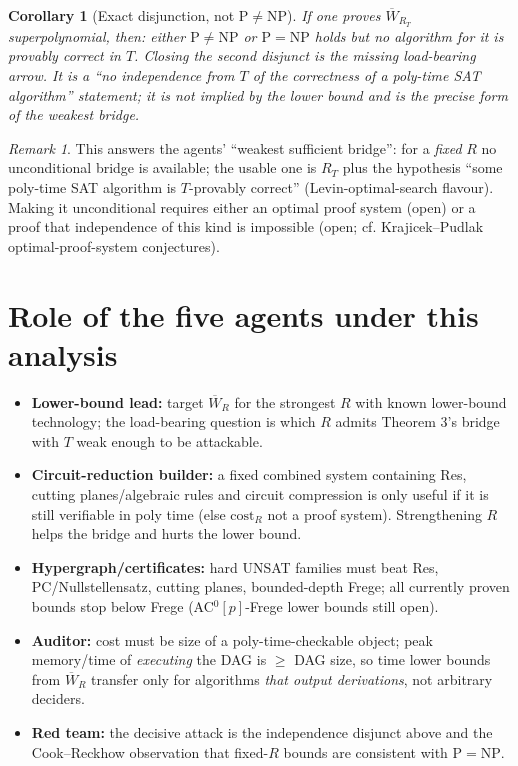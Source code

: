 \documentclass[11pt]{article}
\newtheorem{corollary}[theorem]{Corollary}
\theoremstyle{remark}\newtheorem*{remark}{Remark}
\begin{document}
\begin{corollary}[Exact disjunction, not P$\ne$NP]
If one proves $\overline W_{R_T}$ superpolynomial, then: \emph{either} $\mathrm{P}\ne\mathrm{NP}$ \emph{or} $\mathrm{P}=\mathrm{NP}$ holds but no algorithm for it is
provably correct in $T$. Closing the second disjunct is the missing load-bearing arrow. It is a ``no independence from $T$ of the correctness of a poly-time SAT algorithm''
statement; it is not implied by the lower bound and is the precise form of the weakest bridge.
\end{corollary}
\begin{remark} This answers the agents' ``weakest sufficient bridge'': for a \emph{fixed} $R$ no unconditional bridge is available; the usable one is
$R_T$ plus the hypothesis ``some poly-time SAT algorithm is $T$-provably correct'' (Levin-optimal-search flavour). Making it unconditional requires either
an optimal proof system (open) or a proof that independence of this kind is impossible (open; cf. Krajicek--Pudlak optimal-proof-system conjectures).
\end{remark}

\section{Role of the five agents under this analysis}
\begin{itemize}
\item \textbf{Lower-bound lead:} target $\overline W_{R}$ for the strongest $R$ with known lower-bound technology; the load-bearing question is which $R$ admits Theorem 3's bridge with $T$ weak enough to be attackable.
\item \textbf{Circuit-reduction builder:} a fixed combined system containing Res, cutting planes/algebraic rules and circuit compression is only useful if it is still verifiable in poly time (else $\mathrm{cost}_R$ not a proof system). Strengthening $R$ helps the bridge and hurts the lower bound.
\item \textbf{Hypergraph/certificates:} hard UNSAT families must beat Res, PC/Nullstellensatz, cutting planes, bounded-depth Frege; all currently proven bounds stop below Frege (AC$^0[p]$-Frege lower bounds still open).
\item \textbf{Auditor:} cost must be size of a poly-time-checkable object; peak memory/time of \emph{executing} the DAG is $\ge$ DAG size, so time lower bounds from $\overline W_R$ transfer only for algorithms \emph{that output derivations}, not arbitrary deciders.
\item \textbf{Red team:} the decisive attack is the independence disjunct above and the Cook--Reckhow observation that fixed-$R$ bounds are consistent with $\mathrm{P}=\mathrm{NP}$.
\end{itemize}
\end{document}
